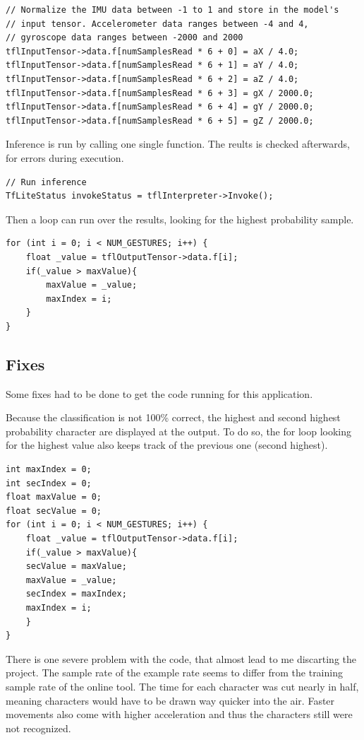 \documentclass[a4paper,titlepage]{article}
\begin{document}
\begin{lstlisting}
// Normalize the IMU data between -1 to 1 and store in the model's
// input tensor. Accelerometer data ranges between -4 and 4,
// gyroscope data ranges between -2000 and 2000
tflInputTensor->data.f[numSamplesRead * 6 + 0] = aX / 4.0;
tflInputTensor->data.f[numSamplesRead * 6 + 1] = aY / 4.0;
tflInputTensor->data.f[numSamplesRead * 6 + 2] = aZ / 4.0;
tflInputTensor->data.f[numSamplesRead * 6 + 3] = gX / 2000.0;
tflInputTensor->data.f[numSamplesRead * 6 + 4] = gY / 2000.0;
tflInputTensor->data.f[numSamplesRead * 6 + 5] = gZ / 2000.0;
\end{lstlisting}

Inference is run by calling one single function.
The reults is checked afterwards, for errors during execution.

\begin{lstlisting}
// Run inference
TfLiteStatus invokeStatus = tflInterpreter->Invoke();
\end{lstlisting}

Then a loop can run over the results, looking for the highest probability sample.

\begin{lstlisting}
for (int i = 0; i < NUM_GESTURES; i++) {
    float _value = tflOutputTensor->data.f[i];
    if(_value > maxValue){
        maxValue = _value;
        maxIndex = i;
    }
}
\end{lstlisting}

\subsection{Fixes}

Some fixes had to be done to get the code running for this application.

Because the classification is not 100\% correct, the highest and second highest probability character are displayed at the output.
To do so, the for loop looking for the highest value also keeps track of the previous one (second highest).

\begin{lstlisting}
int maxIndex = 0;
int secIndex = 0;
float maxValue = 0;
float secValue = 0;
for (int i = 0; i < NUM_GESTURES; i++) {
    float _value = tflOutputTensor->data.f[i];
    if(_value > maxValue){
    secValue = maxValue;
    maxValue = _value;
    secIndex = maxIndex;
    maxIndex = i;
    }
}
\end{lstlisting}

There is one severe problem with the code, that almost lead to me discarting the project.
The sample rate of the example rate seems to differ from the training sample rate of the online tool.
The time for each character was cut nearly in half, meaning characters would have to be drawn way quicker into the air.
Faster movements also come with higher acceleration and thus the characters still were not recognized.
\end{document}

